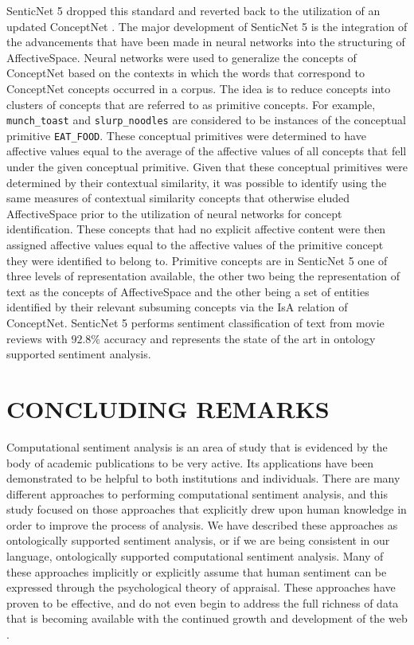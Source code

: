 \documentclass[letterpaper, 10 pt, conference]{ieeeconf}
\begin{document}
SenticNet 5 dropped this standard and reverted back to the utilization of an updated ConceptNet \textcolor{gray}{\cite{CambriaPoria}}. The major development of SenticNet 5 is the integration of the advancements that have been made in neural networks into the structuring of AffectiveSpace. Neural networks were used to generalize the concepts of ConceptNet based on the contexts in which the words that correspond to ConceptNet concepts occurred in a corpus. The idea is to reduce concepts into clusters of concepts that are referred to as primitive concepts. For example, \texttt{munch\_toast} and \texttt{slurp\_noodles} are considered to be instances of the conceptual primitive \texttt{EAT\_FOOD}. These conceptual primitives were determined to have affective values equal to the average of the affective values of all concepts that fell under the given conceptual primitive. Given that these conceptual primitives were determined by their contextual similarity, it was possible to identify using the same measures of contextual similarity concepts that otherwise eluded AffectiveSpace prior to the utilization of neural networks for concept identification. These concepts that had no explicit affective content were then assigned affective values equal to the affective values of the primitive concept they were identified to belong to. Primitive concepts are in SenticNet 5 one of three levels of representation available, the other two being the representation of text as the concepts of AffectiveSpace and the other being a set of entities identified by their relevant subsuming concepts via the IsA relation of ConceptNet. SenticNet 5 performs sentiment classification of text from movie reviews with $92.8\%$ accuracy and represents the state of the art in ontology supported sentiment analysis.


\section{CONCLUDING REMARKS}

Computational sentiment analysis is an area of study that is evidenced by the body of academic publications to be very active. Its applications have been demonstrated to be helpful to both institutions and individuals. There are many different approaches to performing computational sentiment analysis, and this study focused on those approaches that explicitly drew upon human knowledge in order to improve the process of analysis. We have described these approaches as ontologically supported sentiment analysis, or if we are being consistent in our language, ontologically supported computational sentiment analysis. Many of these approaches implicitly or explicitly assume that human sentiment can be expressed through the psychological theory of appraisal. These approaches have proven to be effective, and do not even begin to address the full richness of data that is becoming available with the continued growth and development of the web \textcolor{gray}{\cite{CambriaSchuller}}.
\end{document}
